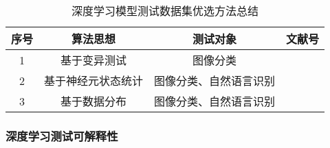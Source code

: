 \begin{table}[t]
	\renewcommand\arraystretch{1.5}
	\small
	\centering
	\caption{深度学习模型测试数据集优选方法总结}
	\label{tab:testingDataPri}
	\begin{tabular}{cccc}
		\toprule
		\textbf{序号} & \textbf{算法思想}  & \textbf{测试对象} & \textbf{文献号}                                                    \\
		\midrule
		1             & 基于变异测试       & 图像分类              & \cite{Wang2021Prioritizing}\cite{Ma2018DeepMutation}                     \\
		2             & 基于神经元状态统计 & 图像分类、自然语言识别  & \cite{Liu2022DeepState}\cite{Byun2019Input}\cite{Gao2022Adaptive}              \\
		3             & 基于数据分布       & 图像分类、自然语言识别  & \cite{Shen2020MultipleBoundary}\cite{Feng2020DeepGini}\cite{Hu2022AnEmpirical} \\
		\bottomrule
	\end{tabular}
\end{table}






\subsubsection{深度学习测试可解释性}

\iffalse
	Zhang等人~\citess{zhang2021duo}提出了一种结合模糊测试和差分生成输入的深度学习框架测试方法Duo，用于解释和评估TensorFlow、PyTorch、MNN、MXNet等深度学习框架；也提出了一种基于模糊测试的算子级精度测试方法Predoo~\citess{zhang2021predoo}，用于估计TensorFlow中单个深度学习算子的精度误差。
	Hu等人~\citess{Hu2019DeepMutationPlusPlus}提出了一种基于变异测试的DNN工具DeepMutation++，用于对包括前馈神经网络(FNN)和有状态循环神经网络(RNN)在内的DNN的质量评估，不仅可以静态分析DNN模型对整个输入的鲁棒性，还可以通过运行时分析识别顺序输入的易受攻击部分。
	Xie等人~\citess{Xie2019DiffChaser}提出了一种自动黑盒测试框架DiffChaser，用于检测深度学习模型在量化、压缩前后的非目标或目标不一致性。
	Du等人~\citess{Du2020Marble}提出了的方法Marble构建了一个概率模型，通过抽象来紧凑表征RNN的鲁棒性，用于对基于RNN的深度学习系统进行定量的鲁棒性分析。

	Luo等人~\citess{luo2021graph}将算子级别的覆盖指标引入图论，提出了一种基于图的模糊测试方法来捕捉深度学习框架异常、提高深度学习框架质量和可解释性的方法。
	Du等人~\citess{Du2019DeepStellar}~\citess{Du2019AQuantitative}提出了一个基于对抗性样本检测和覆盖引导测试生成的深度学习模型测试方法DeepStellar，基于两个轨迹相似性指标和五个覆盖充分性指标对循环神经网络（RNN）进行定量分析和可解释性研究。
	Lee等人~\citess{Lee2020Effective}提出了一种对神经网络进行白盒测试的新方法Adapt，通过使神经元选择策略不断地自适应正在进行的测试状态，增强了深度神经网络的可解释性，在覆盖率和对抗性输入方面有有效表现。
	Wang等人~\citess{wang2020deepsonar}提出一种识别AI合成假声音的方法DeepSonar，利用对分层神经元激活模式学习来增强深度神经网络在语音识别方面的可解释性，推测真实和AI合成的假声音之间的细微差异，同时也对操纵攻击（例如语音转换和附加现实世界噪声）的情况具有鲁棒性。
\fi



